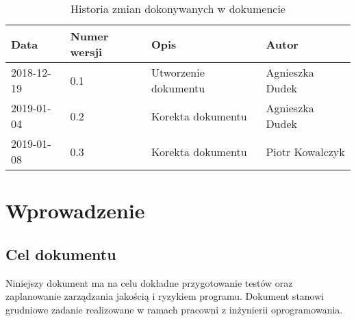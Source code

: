 \documentclass{article}
\begin{document}
\begin{titlepage}






\end{titlepage}

\addtocounter{page}{1}
\newpage

\begin{table}[h!]
	\begin{center}
		\caption{Historia zmian dokonywanych w dokumencie}
		\begin{tabular}{|l|l|l|l|}
			\hline
			Data & Numer wersji & Opis & Autor \\
			\hline \hline
			2018-12-19 & 0.1 & Utworzenie dokumentu & Agnieszka Dudek \\
			\hline
			2019-01-04 & 0.2 & Korekta dokumentu & Agnieszka Dudek \\
			\hline
			2019-01-08 & 0.3 & Korekta dokumentu & Piotr Kowalczyk \\
			\hline 
    \end{tabular}
	\end{center}
\end{table}	

\tableofcontents

\newpage


\section{Wprowadzenie}

\subsection{Cel dokumentu}
Niniejszy dokument ma na celu dokładne przygotowanie testów oraz zaplanowanie zarządzania jakością i ryzykiem programu.
Dokument stanowi grudniowe zadanie realizowane w ramach pracowni z inżynierii oprogramowania.
\end{document}
